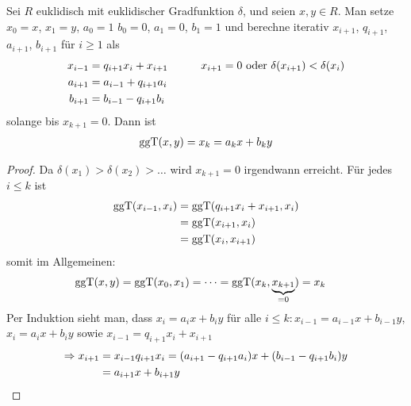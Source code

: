 \begin{proposition}
	Sei $R$ euklidisch mit euklidischer Gradfunktion $\delta$, und seien $x,y \in R$. Man setze $x_0 = x$, $x_1 = y$, $a_0=1$ $b_0 = 0$, $a_1 = 0$, $b_1 = 1$ und berechne iterativ $x_{i+1}$, $q_{i+1}$, $a_{i+1}$, $b_{i+1}$ für $i \ge 1$ als
	\begin{align}
		x_{i-1} &= q_{i+1}x_i + x_{i+1} &\qquad &x_{i+1} = 0 \text{ oder } \delta(x_{i+1}) < \delta(x_i) \notag \\
		a_{i+1} &= a_{i-1} + q_{i+1}a_i & & \notag \\
		b_{i+1} &= b_{i-1} - q_{i+1}b_i & & \notag
	\end{align}
	solange bis $x_{k+1} = 0$. Dann ist
	\begin{align}
		\operatorname{ggT}(x,y) = x_k = a_k x + b_k y \notag
	\end{align}
\end{proposition}

\begin{proof}
	Da $\delta(x_1) > \delta(x_2) > \dots$ wird $x_{k+1} = 0$ irgendwann erreicht. Für jedes $i \le k$ ist 
	\begin{align}
		\operatorname{ggT}(x_{i-1}, x_i) &= \operatorname{ggT}(q_{i+1}x_i + x_{i+1}, x_i)\notag \\
		&=\operatorname{ggT}(x_{i+1}, x_i) \notag \\
		&= \operatorname{ggT}(x_i, x_{i+1}) \notag
	\end{align}
	somit im Allgemeinen:
	\begin{align}
		\operatorname{ggT}(x,y) &= \operatorname{ggT}(x_0,x_1) = \dots = \operatorname{ggT}(x_k, \underbrace{x_{k+1}}_{=0}) = x_k \notag
	\end{align}
	Per Induktion sieht man, dass $x_i = a_i x + b_i y$ für alle $i \le k: x_{i-1} = a_{i-1} x + b_{i-1}y$, $x_i = a_i x + b_i y$ sowie $x_{i-1} = q_{i+1} x_i + x_{i+1}$\\
	\begin{align}
	\Rightarrow x_{i+1} &= x_{i-1}q_{i+1}x_i = (a_{i+1} - q_{i+1} a_i)x + (b_{i-1}-q_{i+1}b_i)y \notag\\
	&= a_{i+1}x + b_{i+1}y\notag
	\end{align}
\end{proof}

